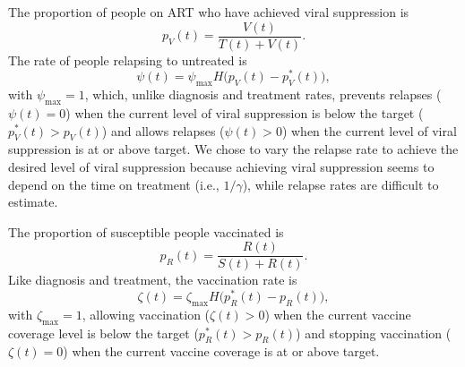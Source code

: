 \documentclass{article}
\begin{document}
The proportion of people on ART who have achieved viral suppression is
\begin{equation}
  p_V(t) = \frac{V(t)}{T(t) + V(t)}.
\end{equation}
The rate of people relapsing to untreated is
\begin{equation}
  \label{relapse_rate}
  \psi(t) = \psi_{\max} H\big(p_V(t) - p_V^*(t)\big),
\end{equation}
with $\psi_{\max} = 1$, which, unlike diagnosis and treatment rates,
prevents relapses ($\psi(t) = 0$) when the current level of viral
suppression is below the target ($p_V^*(t) > p_V(t)$) and allows
relapses ($\psi(t) > 0$) when the current level of viral suppression
is at or above target.  We chose to vary the relapse rate to achieve
the desired level of viral suppression because achieving viral
suppression seems to depend on the time on treatment (i.e.,
$1 / \gamma$), while relapse rates are difficult to estimate.

The proportion of susceptible people vaccinated is
\begin{equation}
  p_R(t) = \frac{R(t)}{S(t) + R(t)}.
\end{equation}
Like diagnosis and treatment, the vaccination rate is
\begin{equation}
  \label{vaccination_rate}
  \zeta(t) = \zeta_{\max} H\big(p_R^*(t) - p_R(t)\big),
\end{equation}
with $\zeta_{\max} = 1$, allowing vaccination ($\zeta(t) > 0$) when
the current vaccine coverage level is below the target
($p_R^*(t) > p_R(t)$) and stopping vaccination ($\zeta(t) = 0$) when
the current vaccine coverage is at or above target.
\end{document}
